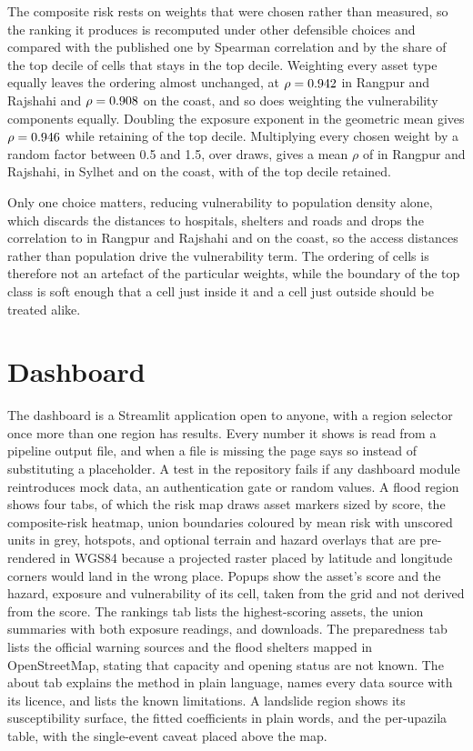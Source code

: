 \documentclass[10pt,a4paper,twocolumn]{article}
\begin{document}
The composite risk rests on weights that were chosen rather than measured, so the ranking it produces is recomputed under other defensible choices and compared with the published one by Spearman correlation and by the share of the top decile of cells that stays in the top decile. Weighting every asset type equally leaves the ordering almost unchanged, at $\rho=0.942{}$ in Rangpur and Rajshahi and $\rho=0.908{}$ on the coast, and so does weighting the vulnerability components equally. Doubling the exposure exponent in the geometric mean gives $\rho=0.946{}$ while retaining \RRSensExposureDoubleTop{} of the top decile. Multiplying every chosen weight by a random factor between 0.5 and 1.5, over \RRSensDraws{} draws, gives a mean $\rho$ of \RRSensRandomRho{} in Rangpur and Rajshahi, \SylhetSensRandomRho{} in Sylhet and \CoastalSensRandomRho{} on the coast, with \RRSensRandomTop{} of the top decile retained.

Only one choice matters, reducing vulnerability to population density alone, which discards the distances to hospitals, shelters and roads and drops the correlation to \RRSensPopOnlyRho{} in Rangpur and Rajshahi and \CoastalSensPopOnlyRho{} on the coast, so the access distances rather than population drive the vulnerability term. The ordering of cells is therefore not an artefact of the particular weights, while the boundary of the top class is soft enough that a cell just inside it and a cell just outside should be treated alike.

\section{Dashboard}

The dashboard is a Streamlit application open to anyone, with a region selector once more than one region has results. Every number it shows is read from a pipeline output file, and when a file is missing the page says so instead of substituting a placeholder. A test in the repository fails if any dashboard module reintroduces mock data, an authentication gate or random values. A flood region shows four tabs, of which the risk map draws asset markers sized by score, the composite-risk heatmap, union boundaries coloured by mean risk with unscored units in grey, hotspots, and optional terrain and hazard overlays that are pre-rendered in WGS84 because a projected raster placed by latitude and longitude corners would land in the wrong place. Popups show the asset's score and the hazard, exposure and vulnerability of its cell, taken from the grid and not derived from the score. The rankings tab lists the highest-scoring assets, the union summaries with both exposure readings, and downloads. The preparedness tab lists the official warning sources and the flood shelters mapped in OpenStreetMap, stating that capacity and opening status are not known. The about tab explains the method in plain language, names every data source with its licence, and lists the known limitations. A landslide region shows its susceptibility surface, the fitted coefficients in plain words, and the per-upazila table, with the single-event caveat placed above the map.
\end{document}
